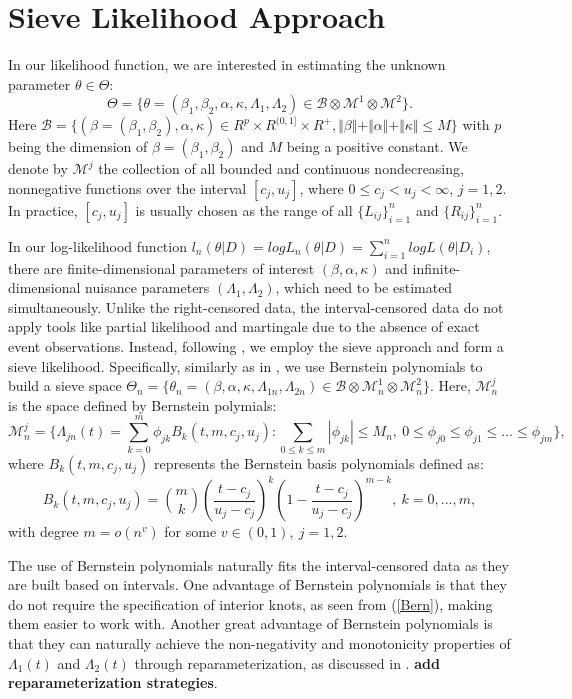 \section{Sieve Likelihood Approach}
In our likelihood function, we are interested in estimating the unknown parameter $\theta \in \Theta$:
$$\Theta = \{ \theta = (\beta_1, \beta_2, \alpha, \kappa, \Lambda_{1}, \Lambda_{2}) \in \mathcal{B} \otimes \mathcal{M}^1 \otimes \mathcal{M}^2 \}.$$
Here $\mathcal{B}=\{(\beta=(\beta_1,\beta_2), \alpha,\kappa) \in R^p \times R^{(0,1]} \times R^{+},\Vert\beta\Vert + \Vert\alpha\Vert + \Vert\kappa\Vert \leq M\}$ with $p$ being the dimension of $\beta=(\beta_1, \beta_2)$ and $M$ being a positive constant. We denote by $\mathcal{M}^j$ the collection of all bounded and continuous nondecreasing, nonnegative functions over the interval $[c_j,u_j]$, where $0 \leq c_j < u_j < \infty$, $j = 1,2$. In practice, $[c_j,u_j]$ is usually chosen as the range of all $\{L_{ij}\}_{i=1}^n$ and $\{R_{ij}\}_{i=1}^n$.

In our log-likelihood function $l_{n}(\theta|D)=log{L_n(\theta|D)}=\sum_{i=1}^{n}log{L(\theta|D_i)}$, there are finite-dimensional parameters of interest $(\beta,\alpha,\kappa)$ and infinite-dimensional nuisance parameters $(\Lambda_{1},\Lambda_{2})$, which need to be estimated simultaneously. Unlike the right-censored data, the interval-censored data do not apply tools like partial likelihood and martingale due to the absence of exact event observations. Instead, following \citet{univariate_PO_sieve}, we employ the sieve approach and form a sieve likelihood. Specifically, similarly as in \citet{frailty_case_II_transformation_sieve}, we use Bernstein polynomials to build a sieve space $\Theta_n = \{ \theta_n = (\beta, \alpha, \kappa, \Lambda_{1n}, \Lambda_{2n}) \in \mathcal{B} \otimes \mathcal{M}_{n}^1 \otimes \mathcal{M}_{n}^2 \}$. Here, $\mathcal{M}_n^j$ is the space defined by Bernstein polymials:
$$\mathcal{M}_n^j = \{ \Lambda_{jn}(t) = \sum_{k=0}^{m} \phi_{jk}B_{k}(t,m,c_j,u_j): \sum_{0 \leq k \leq m} |\phi_{jk}| \leq M_{n}, \ 0 \leq \phi_{j0} \leq \phi_{j1} \leq ... \leq \phi_{jm} \},$$
where $B_{k}(t,m,c_j,u_j)$ represents the Bernstein basis polynomials defined as:
\begin{equation}
B_{k}(t,m,c_j,u_j) =  {m \choose k} (\frac{t-c_j}{u_j-c_j})^{k} (1-\frac{t-c_j}{u_j-c_j})^{m-k}, \ k = 0,...,m, \label{Bern}
\end{equation}
with degree $m = o(n^{v})$ for some $v \in (0,1), \ j=1,2$.

The use of Bernstein polynomials naturally fits the interval-censored data as they are built based on intervals. One advantage of Bernstein polynomials is that they do not require the specification of interior knots, as seen from (\ref{Bern}), making them easier to work with. Another great advantage of Bernstein polynomials is that they can naturally achieve the non-negativity and monotonicity properties of $\Lambda_1(t)$ and $\Lambda_2(t)$ through reparameterization, as discussed in \citet{frailty_case_II_transformation_sieve}. \textbf{add reparameterization strategies}.

